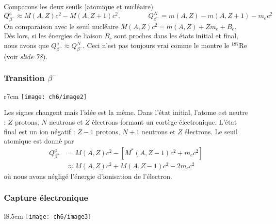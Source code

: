\newpage
Comparons les deux seuils (atomique et nucléaire)
\begin{equation}
Q_{\beta^-}^a \approx M(A,Z)c^2-M(A,Z+1)c^2,\qquad\qquad
Q_{\beta^-}^N = m(A,Z)-m(A,Z+1)-m_ec^2
\end{equation}
On comparaison avec le seuil nucléaire $M(A,Z)c^2 = m(A,Z)+Zm_e+B_e$. Dès lors, si les énergies de liaison 
$B_e$ sont proches dans les états initial et final, nous avons que $Q_{\beta^-}^a\approx Q_{\beta^-}^N$. Ceci
n'est pas toujours vrai comme le montre le $^{187}$Re (voir \textit{slide 78}).



\subsubsection{Transition $\beta^-$}
	\begin{wrapfigure}[9]{r}{7cm}
	\texttt{[image: ch6/image2]}
	\end{wrapfigure}
Les signes changent mais l'idée est la même. Dans l'état initial, l'atome est neutre : $Z$ protons, $N$ neutrons 
et $Z$ électrons formant un cortège électronique. L'état final est un ion négatif : $Z-1$ protons, $N+1$ neutrons 
et $Z$ électrons. Le seuil 
atomique est donné par
\begin{equation}
\begin{array}{ll}
Q_{\beta^+}^a &= M(A,Z)c^2 - [M^*(A,Z-1)c^2+m_ec^2]\\ &\approx M(A,Z)c^2+M(A,Z-1)c^2-2m_ec^2
\end{array}
\end{equation}
où nous avons négligé l'énergie d'ionisation de l'électron.

\subsubsection{Capture électronique}
	\begin{wrapfigure}[14]{l}{8.5cm}
	\vspace{-5mm}
	\texttt{[image: ch6/image3]}
	\end{wrapfigure}

